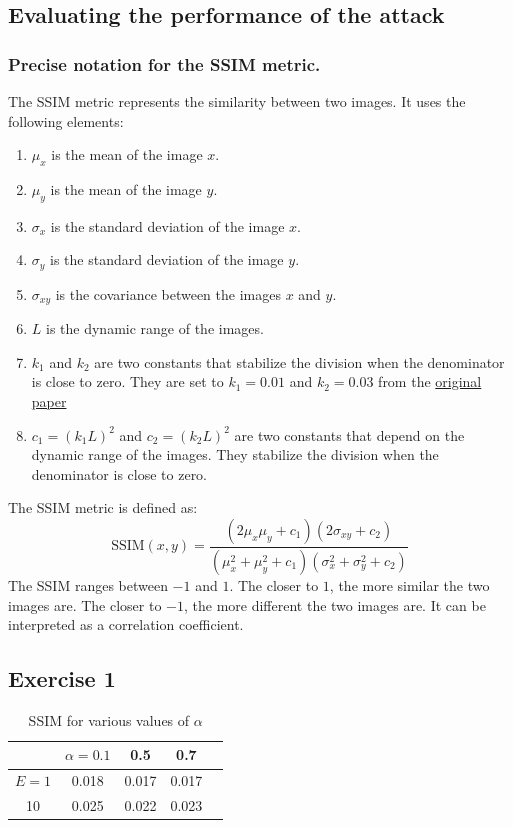 \documentclass[12pt]{article}
\begin{document}
\subsection{Evaluating the performance of the attack}
\subsubsection{Precise notation for the SSIM metric.}
The SSIM metric represents the similarity between two images. It uses the following elements:
\begin{enumerate}
  \item $\mu_x$ is the mean of the image $x$.
  \item $\mu_y$ is the mean of the image $y$.
  \item $\sigma_x$ is the standard deviation of the image $x$.
  \item $\sigma_y$ is the standard deviation of the image $y$.
  \item $\sigma_{xy}$ is the covariance between the images $x$ and $y$.
  \item $L$ is the dynamic range of the images.
  \item $k_1$ and $k_2$ are two constants that stabilize the division when the denominator is close to zero. They are set to $k_1 = 0.01$ and $k_2 = 0.03$ from the \href{https://ece.uwaterloo.ca/~z70wang/publications/ssim.pdf}{original paper}
  \item $c_1 = (k_1 L)^2$ and $c_2 = (k_2 L)^2$ are two constants that depend on the dynamic range of the images. They stabilize the division when the denominator is close to zero.
\end{enumerate}
The SSIM metric is defined as:
\begin{equation}
  \text{SSIM}(x, y) = \frac{(2 \mu_x \mu_y + c_1)(2 \sigma_{xy} + c_2)}{(\mu_x^2 + \mu_y^2 + c_1)(\sigma_x^2 + \sigma_y^2 + c_2)}
\end{equation}
The SSIM ranges between $-1$ and $1$. The closer to $1$, the more similar the two images are. The closer to $-1$, the more different the two images are. It can be interpreted as a correlation coefficient.

\subsection{Exercise 1}
\begin{table}[h]
  \centering
  \begin{tabular}{c|c|c|c|c}
            & $\alpha = 0.1$ & 0.5   & 0.7   \\ \hline
    $E = 1$ & 0.018          & 0.017 & 0.017 \\
    10      & 0.025          & 0.022 & 0.023 \\
  \end{tabular}
  \caption{SSIM for various values of $\alpha$}
  \label{tab:SSIM}
\end{table}
\end{document}
